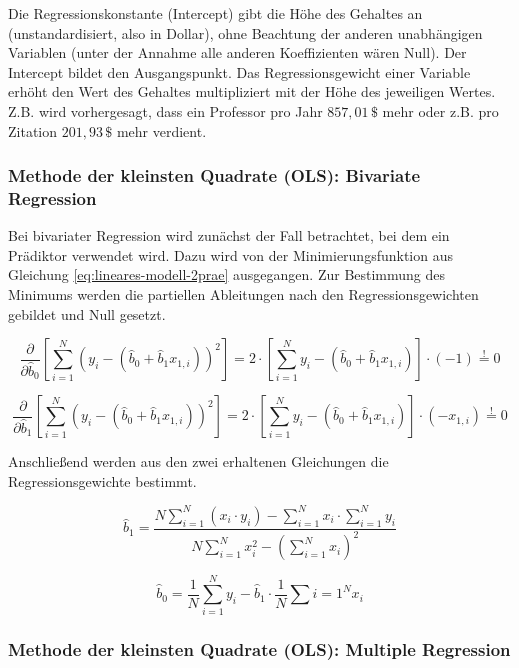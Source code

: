 \documentclass{article}
\numberwithin{equation}{section}
\begin{document}
Die Regressionskonstante (Intercept) gibt die Höhe des Gehaltes an (unstandardisiert, also in Dollar), ohne Beachtung der anderen unabhängigen Variablen (unter der Annahme alle anderen Koeffizienten wären Null). Der Intercept bildet den Ausgangspunkt. Das Regressionsgewicht einer Variable erhöht den Wert des Gehaltes multipliziert mit der Höhe des jeweiligen Wertes. Z.B. wird vorhergesagt, dass ein Professor pro Jahr $857,01\,\$$ mehr oder z.B. pro Zitation $201,93\,\$$ mehr verdient.

\subsubsection{Methode der kleinsten Quadrate (OLS): Bivariate Regression}

Bei bivariater Regression wird zunächst der Fall betrachtet, bei dem ein Prädiktor verwendet wird. Dazu wird von der Minimierungsfunktion aus Gleichung \ref{eq:lineares-modell-2prae} ausgegangen. Zur Bestimmung des Minimums werden die partiellen Ableitungen nach den Regressionsgewichten gebildet und Null gesetzt.

\begin{equation}
\frac{\partial}{\partial \hat b_0} \left[ \sum_{i=1}^N (y_i - (\hat b_0 + \hat b_1 x_{1,i}))^2 \right]  = 2 \cdot \left[ \sum_{i=1}^N y_i - (\hat b_0 + \hat b_1 x_{1,i}) \right] \cdot (-1) \overset{!}{=} 0
\end{equation}

\begin{equation}
\frac{\partial}{\partial \hat b_1} \left[ \sum_{i=1}^N (y_i - (\hat b_0 + \hat b_1 x_{1,i}))^2 \right] = 2 \cdot \left[ \sum_{i=1}^N y_i - (\hat b_0 + \hat b_1 x_{1,i}) \right] \cdot (-x_{1,i}) \overset{!}{=} 0
\end{equation}

Anschließend werden aus den zwei erhaltenen Gleichungen die Regressionsgewichte bestimmt.

\begin{equation}
\hat b_1 = \frac{N \sum_{i=1}^N (x_i \cdot y_i) - \sum_{i=1}^N x_i \cdot \sum_{i=1}^N y_i}{N \sum_{i=1}^N x_i^2 - (\sum_{i=1}^N x_i)^2}
\end{equation}

\begin{equation}
\hat b_0 = \frac{1}{N} \sum_{i=1}^{N} y_i - \hat b_1 \cdot \frac{1}{N} \sum{i=1}^N x_i
\end{equation}

\subsubsection{Methode der kleinsten Quadrate (OLS): Multiple Regression}
\end{document}
